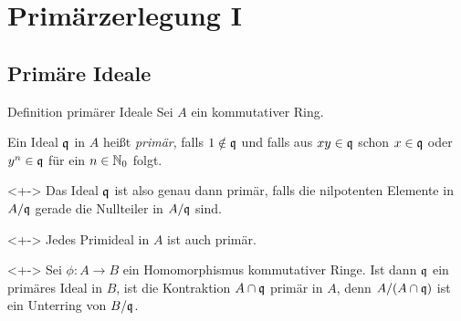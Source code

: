 \section{Primärzerlegung I}

\subsection{Primäre Ideale}


\begin{frame}{Definition primärer Ideale}
	Sei \(A\) ein kommutativer Ring.
	\begin{definition}
		Ein Ideal \(\mathfrak{q}\) in \(A\) heißt \emph{primär}, falls \(1 \notin \mathfrak{q}\) und falls aus \(x y \in
		\mathfrak{q}\) schon \(x \in \mathfrak{q}\) oder \(y^n \in \mathfrak{q}\) für ein \(n \in \mathbb N_0\) folgt.
	\end{definition}
	\begin{visibleenv}<+->
		Das Ideal \(\mathfrak{q}\) ist also genau dann primär, falls die nilpotenten Elemente in \(A/\mathfrak{q}\) gerade die
		Nullteiler in \(A/\mathfrak{q}\) sind.
	\end{visibleenv}
	\begin{example}<+->
		Jedes Primideal in \(A\) ist auch primär.
	\end{example}
	\begin{example}<+->
		Sei \(\phi\colon A \to B\) ein Homomorphismus kommutativer Ringe. Ist dann \(\mathfrak{q}\) ein primäres Ideal in
		\(B\), ist die Kontraktion \(A \cap \mathfrak{q}\) primär in \(A\), denn \(A/(A \cap \mathfrak{q})\) ist ein Unterring
		von \(B/\mathfrak{q}\).
	\end{example}
\end{frame}

